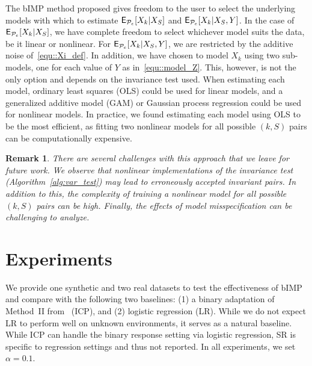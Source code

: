 \documentclass[conference,letterpaper]{IEEEtran}
\newtheorem{remark}{Remark}
\begin{document}
The \textsf{bIMP} method proposed gives freedom to the user to select the underlying models with which to estimate $\operatorname{\sf E}_{\mathcal{P}_e}[X_k|X_S]$ and $\operatorname{\sf E}_{\mathcal{P}_e}[X_k|X_S,Y]$. In the case of $\operatorname{\sf E}_{\mathcal{P}_e}[X_k|X_S]$, we have complete freedom to select whichever model suits the data, be it linear or nonlinear.  For $\operatorname{\sf E}_{\mathcal{P}_e}[X_k|X_S,Y]$, we are restricted by the additive noise of~\eqref{equ::Xi_def}. In addition, we have chosen to model $X_k$ using two sub-models, one for each value of $Y$ as in~\eqref{equ::model_Z}. This, however, is not the only option and depends on the invariance test used. When estimating each model, ordinary least squares (OLS) could be used for linear models, and a generalized additive model (GAM) or Gaussian process regression could be used for nonlinear models. In practice, we found estimating each model using OLS to be the most efficient, as fitting two nonlinear models for all possible $(k,S)$ pairs can be computationally expensive. 

\begin{remark}
There are several challenges with this approach that we leave for future work. We observe that nonlinear implementations of the invariance test (Algorithm~\ref{alg:var_test}) may lead to erroneously accepted invariant pairs. In addition to this, the complexity of training a nonlinear model for all possible $(k,S)$ pairs can be high. Finally, the effects of model misspecification can be challenging to analyze.
\end{remark}
\section{Experiments}
We provide one synthetic and two real datasets to test the effectiveness of \textsf{bIMP} and compare with the following two baselines: (1) a binary adaptation of Method~II from~\cite{peters2016causal} (\textsf{ICP}), and (2) logistic regression (\textsf{LR}). While we do not expect \textsf{LR} to perform well on unknown environments, it serves as a natural baseline. While \textsf{ICP} can handle the binary response setting via logistic regression, \textsf{SR} is specific to regression settings and thus not reported. In all experiments, we set $\alpha = 0.1$. 
\end{document}
